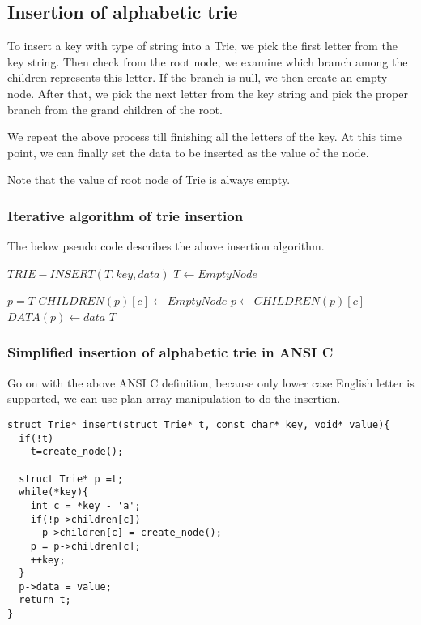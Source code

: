 \documentclass{article}
\begin{document}
\subsection{Insertion of alphabetic trie}
To insert a key with type of string into a Trie, we pick the first letter
from the key string. Then check from the root node, we examine which branch
among the children represents this letter. If the branch is null, we then
create an empty node. After that, we pick the next letter from the key string
and pick the proper branch from the grand children of the root.

We repeat the above process till finishing all the letters of the key. 
At this time point, we can finally set the data to be inserted as the value 
of the node.

Note that the value of root node of Trie is always empty.

\subsubsection{Iterative algorithm of trie insertion}

The below pseudo code describes the above insertion algorithm.

\begin{algorithmic}
\STATE $TRIE-INSERT(T, key, data)$
   \STATE $T \leftarrow EmptyNode$ \ENDIF

  \STATE $p=T$
      \STATE $CHILDREN(p)[c] \leftarrow EmptyNode$
    \ENDIF
    \STATE $p \leftarrow CHILDREN(p)[c]$
  \ENDFOR
  \STATE $DATA(p) \leftarrow data$
  \RETURN $T$
\end{algorithmic}

\subsubsection*{Simplified insertion of alphabetic trie in ANSI C}
Go on with the above ANSI C definition, because only lower case 
English letter is supported, we can use plan array manipulation
to do the insertion.

\lstset{language=C}
\begin{lstlisting}
struct Trie* insert(struct Trie* t, const char* key, void* value){
  if(!t)
    t=create_node();

  struct Trie* p =t;
  while(*key){
    int c = *key - 'a';
    if(!p->children[c])
      p->children[c] = create_node();
    p = p->children[c];
    ++key;
  }
  p->data = value;
  return t;
}
\end{lstlisting}
\end{document}
